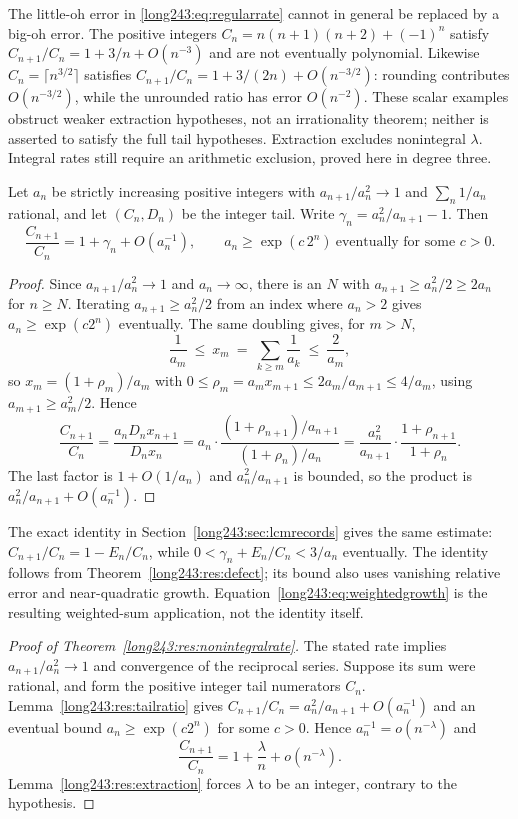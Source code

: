 The little-oh error in \eqref{long243:eq:regularrate} cannot in general
be replaced by a big-oh error. The positive integers
$C_n=n(n+1)(n+2)+(-1)^n$ satisfy $C_{n+1}/C_n=1+3/n+O(n^{-3})$ and are not
eventually polynomial.
Likewise $C_n=\lceil n^{3/2}\rceil$ satisfies
$C_{n+1}/C_n=1+3/(2n)+O(n^{-3/2})$: rounding contributes
$O(n^{-3/2})$, while the unrounded ratio has error $O(n^{-2})$.
These scalar examples obstruct weaker extraction hypotheses, not an
irrationality theorem; neither is asserted to satisfy the full tail
hypotheses. Extraction excludes nonintegral $\lambda$. Integral rates
still require an arithmetic exclusion, proved here in degree three.

\begin{lemma}\label{long243:res:tailratio}
Let $a_n$ be strictly increasing positive integers with $a_{n+1}/a_n^2\to1$ and
$\sum_n1/a_n$ rational, and let $(C_n,D_n)$ be the integer tail.
Write $\gamma_n=a_n^2/a_{n+1}-1$.  Then
\[
 \frac{C_{n+1}}{C_n}=1+\gamma_n+O(a_n^{-1}),
 \qquad a_n\ge\exp(c\,2^n)\ \text{eventually for some }c>0 .
\]
\end{lemma}

\begin{proof}
Since $a_{n+1}/a_n^2\to1$ and $a_n\to\infty$, there is an $N$ with
$a_{n+1}\ge a_n^2/2\ge2a_n$ for $n\ge N$.  Iterating $a_{n+1}\ge a_n^2/2$ from
an index where $a_n>2$ gives $a_n\ge\exp(c2^n)$ eventually.  The same doubling
gives, for $m>N$,
\[
 \frac1{a_m}\ \le\ x_m\ =\ \sum_{k\ge m}\frac1{a_k}\ \le\ \frac2{a_m},
\]
so $x_{m}=(1+\rho_{m})/a_{m}$ with
$0\le\rho_{m}=a_mx_{m+1}\le 2a_m/a_{m+1}\le4/a_m$, using
$a_{m+1}\ge a_m^2/2$.  Hence
\[
 \frac{C_{n+1}}{C_n}=\frac{a_nD_nx_{n+1}}{D_nx_n}
 =a_n\cdot\frac{(1+\rho_{n+1})/a_{n+1}}{(1+\rho_n)/a_n}
 =\frac{a_n^2}{a_{n+1}}\cdot\frac{1+\rho_{n+1}}{1+\rho_n}.
\]
The last factor is $1+O(1/a_n)$ and $a_n^2/a_{n+1}$ is bounded, so the product
is $a_n^2/a_{n+1}+O(a_n^{-1})$.
\end{proof}

The exact identity in Section~\ref{long243:sec:lcmrecords} gives the same
estimate: $C_{n+1}/C_n=1-E_n/C_n$, while
$0<\gamma_n+E_n/C_n<3/a_n$ eventually. The identity follows from
Theorem~\ref{long243:res:defect}; its bound also uses vanishing relative
error and near-quadratic growth. Equation~\eqref{long243:eq:weightedgrowth}
is the resulting weighted-sum application, not the identity itself.

\begin{proof}[Proof of Theorem~\ref{long243:res:nonintegralrate}]
The stated rate implies $a_{n+1}/a_n^2\to1$ and convergence of the
reciprocal series. Suppose its sum were rational, and form the positive
integer tail numerators $C_n$. Lemma~\ref{long243:res:tailratio} gives
$C_{n+1}/C_n=a_n^2/a_{n+1}+O(a_n^{-1})$ and an eventual bound
$a_n\ge\exp(c2^n)$ for some $c>0$. Hence $a_n^{-1}=o(n^{-\lambda})$ and
\[
 \frac{C_{n+1}}{C_n}=1+\frac{\lambda}{n}+o(n^{-\lambda}).
\]
Lemma~\ref{long243:res:extraction} forces $\lambda$ to be an integer,
contrary to the hypothesis.
\end{proof}

